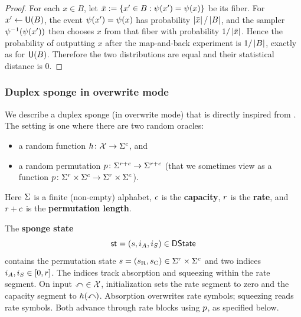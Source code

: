 \begin{proof}
For each \(x\in B\), let \(\bar{x}\mathrel{:=}\left\{x'\in B:\psi(x')=\psi(x)\right\}\) be its fiber. For \(x'\leftarrow\mathsf{U}(B)\), the event \(\psi(x')=\psi(x)\) has probability \(\left|\bar{x}\right|/\left|B\right|\), and the sampler \(\psi^{-1}(\psi(x'))\) then chooses \(x\) from that fiber with probability \(1/\left|\bar{x}\right|\).  Hence the probability of outputting \(x\) after the map-and-back experiment is \(1/\left|B\right|\), exactly as for \(\mathsf{U}(B)\).  Therefore the two distributions are equal and their statistical distance is \(0\).
\leanok
\end{proof}

\subsubsection{Duplex sponge in overwrite mode}
\label{sec:dsfs_duplex_sponge}

We describe a duplex sponge (in overwrite mode) that is directly inspired from \cite{BertoniDPV12}. The setting is one where there are two random oracles:
\begin{itemize}
\item a random function \(h\colon \mathcal X \to \Sigma^{c}\), and
\item a random permutation \(p\colon \Sigma^{r+c} \to \Sigma^{r+c}\) (that we sometimes view as a function \(p\colon \Sigma^{r} \times \Sigma^{c} \to \Sigma^{r} \times \Sigma^{c}\)).
\end{itemize}
Here \(\Sigma\) is a finite (non-empty) alphabet, \(c\) is the \textbf{capacity}, \(r\) is the \textbf{rate}, and \(r+c\) is the \textbf{permutation length}.

The \textbf{sponge state}
\begin{equation*}
\mathsf{st}=(s,i_A,i_S)\in\mathsf{DState}
\end{equation*}
contains the permutation state \(s=(s_{\mathrm R},s_{\mathrm C})\in\Sigma^{r}\times\Sigma^{c}\) and two indices \(i_A,i_S\in[0,r]\). The indices track absorption and squeezing within the rate segment. On input \(\mathbb{x}\in\mathcal X\), initialization sets the rate segment to zero and the capacity segment to \(h(\mathbb{x})\). Absorption overwrites rate symbols; squeezing reads rate symbols. Both advance through rate blocks using \(p\), as specified below.

